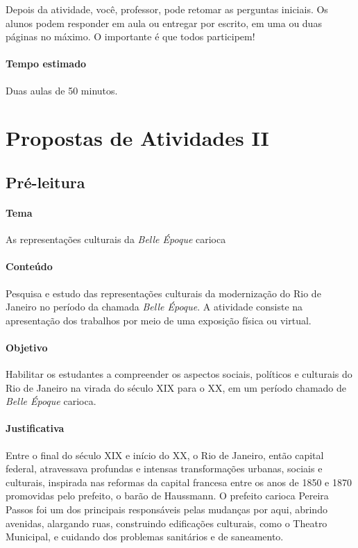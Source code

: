 \documentclass[12pt]{extarticle}
\begin{document}
Depois da atividade, você, professor, pode retomar as perguntas
iniciais. Os alunos podem responder em aula ou entregar por escrito, em
uma ou duas páginas no máximo. O importante é que todos participem!

\paragraph{Tempo estimado} Duas aulas de 50 minutos.

\section{Propostas de Atividades II}



\subsection{Pré-leitura}



\paragraph{Tema} As representações culturais da \emph{Belle Époque} carioca


\paragraph{Conteúdo} Pesquisa e estudo das representações culturais da
modernização do Rio de Janeiro no período da chamada \emph{Belle
Époque}. A atividade consiste na apresentação dos trabalhos por meio de
uma exposição física ou virtual.

\paragraph{Objetivo} Habilitar os estudantes a compreender os aspectos
sociais, políticos e culturais do Rio de Janeiro na virada do século XIX
para o XX, em um período chamado de \emph{Belle Époque} carioca.




\paragraph{Justificativa} Entre o final do século XIX e início do XX, o
Rio de Janeiro, então capital federal, atravessava profundas e intensas
transformações urbanas, sociais e culturais, inspirada nas reformas da
capital francesa entre os anos de 1850 e 1870 promovidas pelo prefeito,
o barão de Haussmann. O prefeito carioca Pereira Passos foi um dos
principais responsáveis pelas mudanças por aqui, abrindo avenidas,
alargando ruas, construindo edificações culturais, como o Theatro
Municipal, e cuidando dos problemas sanitários e de saneamento.
\end{document}
